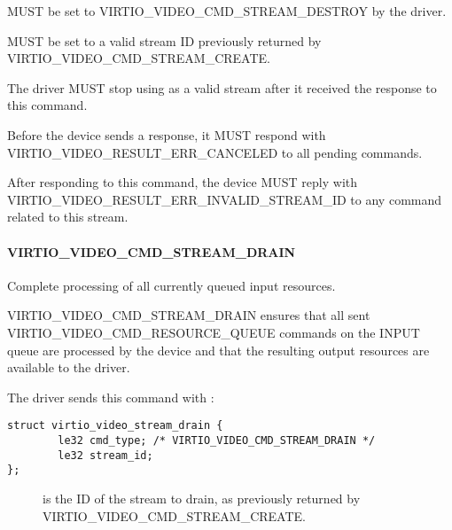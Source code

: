 
 MUST be set to VIRTIO\_VIDEO\_CMD\_STREAM\_DESTROY by
the driver.

 MUST be set to a valid stream ID previously returned
by VIRTIO\_VIDEO\_CMD\_STREAM\_CREATE.

The driver MUST stop using  as a valid stream after it
received the response to this command.


Before the device sends a response, it MUST respond with
VIRTIO\_VIDEO\_RESULT\_ERR\_CANCELED to all pending commands.

After responding to this command, the device MUST reply with
VIRTIO\_VIDEO\_RESULT\_ERR\_INVALID\_STREAM\_ID to any command related
to this stream.

\paragraph{VIRTIO_VIDEO_CMD_STREAM_DRAIN}\label{sec:Device Types / Video Device / Device Operation / Device Operation: Stream commands / VIRTIO_VIDEO_CMD_STREAM_DRAIN}

Complete processing of all currently queued input resources.

VIRTIO\_VIDEO\_CMD\_STREAM\_DRAIN ensures that all sent
VIRTIO\_VIDEO\_CMD\_RESOURCE\_QUEUE commands on the INPUT queue are
processed by the device and that the resulting output resources are
available to the driver.

The driver sends this command with
:

\begin{lstlisting}
struct virtio_video_stream_drain {
        le32 cmd_type; /* VIRTIO_VIDEO_CMD_STREAM_DRAIN */
        le32 stream_id;
};
\end{lstlisting}

\begin{description}
\item[]
is the ID of the stream to drain, as previously returned by
VIRTIO\_VIDEO\_CMD\_STREAM\_CREATE.
\end{description}

